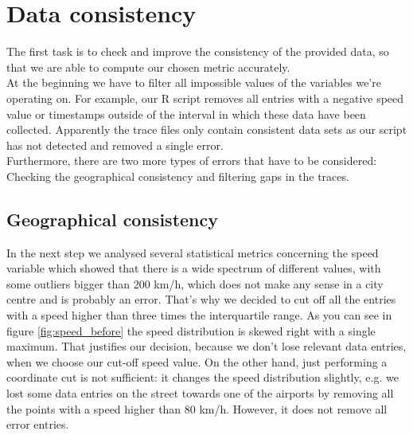 \documentclass[11pt,conference,a4paper,twocolumns,romanappendices]{IEEEtran}
\begin{document}
\section{Data consistency}
The first task is to check and improve the consistency of the provided data, so that we are able to compute our chosen metric accurately. \\
At the beginning we have to filter all impossible values of the variables we're operating on. For example, our R script removes all entries with a negative speed value or timestamps outside of the interval in which these data have been collected.  Apparently the trace files only contain consistent data sets as our script has not detected and removed a single error. \\
Furthermore, there are two more types of errors that have to be considered: Checking the geographical consistency and filtering gaps in the traces.
\subsection{Geographical consistency}

In the next step we analysed several statistical metrics concerning the speed variable which showed that there is a wide spectrum of different values, with some outliers bigger than 200 km/h, which does not make any sense in a city centre and is probably an error. That's why we decided to cut off all the entries with a speed higher than three times the interquartile range. As you can see in figure \ref{fig:speed_before} the speed distribution is skewed right with a single maximum. That justifies our decision, because we don't lose relevant data entries, when we choose our cut-off speed value. On the other hand, just performing a coordinate cut is not sufficient: it changes the speed distribution slightly, e.g. we lost some data entries on the street towards one of the airports by removing all the points with a speed higher than 80 km/h. However, it does not remove all error entries. \\
\end{document}
